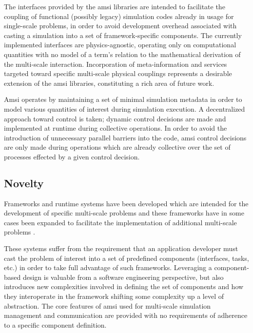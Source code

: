 \documentclass[11pt]{siamltex1213}
\begin{document}
The interfaces provided by the amsi libraries are intended to facilitate the coupling of functional (possibly legacy) simulation codes already in usage for single-scale problems, in order to avoid development overhead associated with casting a simulation into a set of framework-specific components. The currently implemented interfaces are physics-agnostic, operating only on computational quantities with no model of a term's relation to the mathematical derivation of the multi-scale interaction. Incorporation of meta-information and services targeted toward specific multi-scale physical couplings represents a desirable extension of the amsi libraries, constituting a rich area of future work.

Amsi operates by maintaining a set of minimal simulation metadata in order to model various quantities of interest during simulation execution. A decentralized approach toward control is taken; dynamic control decisions are made and implemented at runtime during collective operations. In order to avoid the introduction of unnecessary parallel barriers into the code, amsi control decisions are only made during operations which are already collective over the set of processes effected by a given control decision.

\subsection{Novelty} %
Frameworks and runtime systems have been developed which are intended for the development of specific multi-scale problems \cite{parker2006component} \cite{} \cite{} and these frameworks have in some cases been expanded to facilitate the implementation of additional multi-scale problems \cite{berzins2010uintah}.

These systems suffer from the requirement that an application developer must cast the problem of interest into a set of predefined components (interfaces, tasks, etc.) in order to take full advantage of such frameworks. Leveraging a component-based design is valuable from a software engineering perspective, but also introduces new complexities involved in defining the set of components and how they interoperate in the framework shifting some complexity up a level of abstraction. The core features of amsi used for multi-scale simulation management and communication are provided with no requirements of adherence to a specific component definition.
\end{document}

